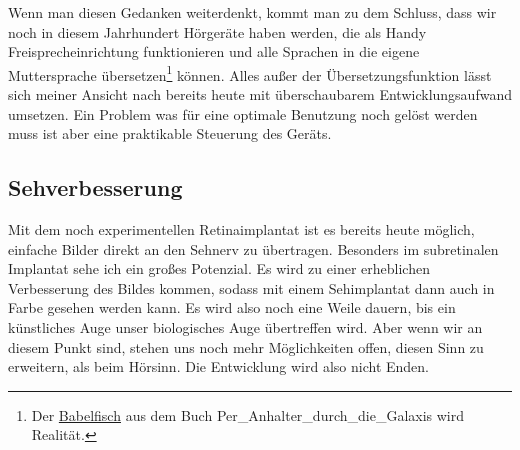 Wenn man diesen Gedanken weiterdenkt, kommt man zu dem Schluss, dass wir noch in diesem Jahrhundert
Hörgeräte haben werden, die als Handy Freisprecheinrichtung funktionieren und alle
\label{sec:Robin:future:hearing:Babel_Fish}%
Sprachen in die
eigene Muttersprache übersetzen\footnote{Der
\href{http://de.wikipedia.org/wiki/Babelfisch}{Babelfisch} aus dem Buch \citetitle
{Per_Anhalter_durch_die_Galaxis} wird Realität.} können. Alles außer der Übersetzungsfunktion lässt
sich meiner Ansicht nach bereits
heute mit überschaubarem Entwicklungsaufwand umsetzen. Ein Problem was für eine optimale Benutzung
noch gelöst werden muss ist aber eine praktikable Steuerung des Geräts.

\subsection{Sehverbesserung}
Mit dem noch experimentellen Retinaimplantat ist es bereits heute möglich, einfache Bilder direkt
an den Sehnerv zu übertragen. Besonders im subretinalen Implantat sehe ich ein großes Potenzial. Es
wird zu einer erheblichen Verbesserung des Bildes kommen, sodass mit einem Sehimplantat dann auch in
Farbe gesehen werden kann. Es wird also noch eine Weile dauern, bis ein künstliches Auge unser
biologisches Auge übertreffen wird. Aber wenn wir an diesem Punkt sind, stehen uns noch mehr
Möglichkeiten offen, diesen Sinn zu erweitern, als beim Hörsinn. Die Entwicklung wird also nicht
Enden.

